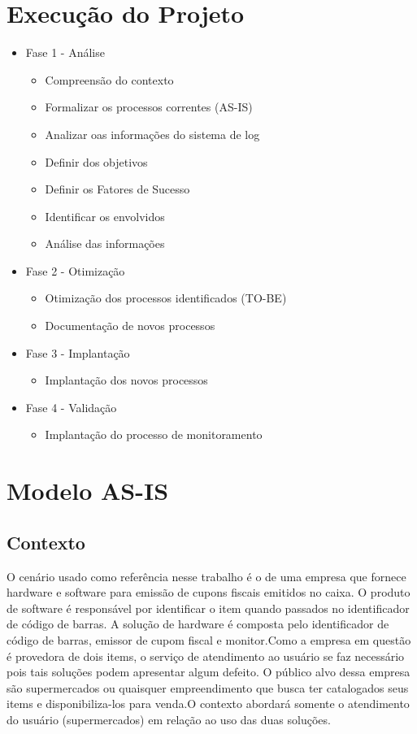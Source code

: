 \documentclass[11pt,a4paper]{article}
\begin{document}
\section{Execução do Projeto}
\begin{itemize}[noitemsep]
\item Fase 1 - Análise
	\begin{itemize}[noitemsep]
		\item Compreensão do contexto
		\item Formalizar os processos correntes (AS-IS)
		\item Analizar oas informações do sistema de log		
		\item Definir dos objetivos
		\item Definir os Fatores de Sucesso
		\item Identificar os envolvidos
		\item Análise das informações
	\end{itemize}		
\item Fase 2 - Otimização
	\begin{itemize}[noitemsep]
		\item Otimização dos processos identificados (TO-BE)	
		\item Documentação de novos processos	
	\end{itemize}
\item Fase 3 - Implantação
	\begin{itemize}[noitemsep]
		\item  Implantação dos novos processos
	\end{itemize}
\item Fase 4 - Validação
	\begin{itemize}[noitemsep]
		\item Implantação do processo de monitoramento	
	\end{itemize}

\end{itemize}

\section{Modelo AS-IS}
\subsection{Contexto}
	O cenário usado como referência nesse trabalho é o de uma empresa que 
	fornece hardware e software para emissão de cupons fiscais emitidos no
	caixa. O produto de software é responsável por identificar o item quando passados no 
	identificador de código de barras. A solução de hardware é composta pelo identificador
	de código de barras, emissor de cupom fiscal e monitor.Como a empresa em questão é 
	provedora de dois items, o serviço de atendimento ao 
	usuário se faz necessário pois tais soluções podem apresentar algum defeito. O público alvo
	dessa empresa são supermercados ou quaisquer empreendimento que busca ter catalogados seus items
	e disponibiliza-los para venda.O contexto abordará somente o atendimento do usuário (supermercados) em 
	relação ao uso das duas soluções.
		
\end{document}
